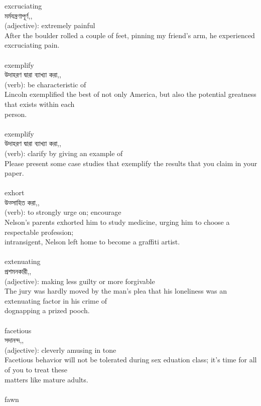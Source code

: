 \documentclass{article}
\begin{document}
{excruciating}\\
{মর্মযন্ত্রণাপূর্ণ,,}\\
{(adjective): extremely painful\\After the boulder rolled a couple of feet, pinning my friend's arm, he experienced excruciating pain.\\}\\
{exemplify}\\
{উদাহরণ দ্বারা ব্যাখ্যা করা,,}\\
{(verb): be characteristic of\\Lincoln exemplified the best of not only America, but also the potential greatness that exists within each\\person.\\}\\
{exemplify}\\
{উদাহরণ দ্বারা ব্যাখ্যা করা,,}\\
{(verb): clarify by giving an example of\\Please present some case studies that exemplify the results that you claim in your paper.\\}\\
{exhort}\\
{উত্সাহিত করা,,}\\
{(verb): to strongly urge on; encourage\\Nelson's parents exhorted him to study medicine, urging him to choose a respectable profession;\\intransigent, Nelson left home to become a graffiti artist.\\}\\
{extenuating}\\
{প্রশমনকারী,,}\\
{(adjective): making less guilty or more forgivable\\The jury was hardly moved by the man's plea that his loneliness was an extenuating factor in his crime of\\dognapping a prized pooch.\\}\\
{facetious}\\
{সদানন্দ,,}\\
{(adjective): cleverly amusing in tone\\Facetious behavior will not be tolerated during sex eduation class; it's time for all of you to treat these\\matters like mature adults.\\}\\
{fawn}\\
\end{document}
